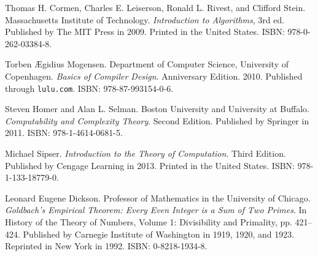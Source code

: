 \begin{thebibliography}{9}
\backrefprint


Thomas H. Cormen, Charles E. Leiserson, Ronald L. Rivest, and Clifford Stein.
Massachusetts Institute of Technology.  \emph{Introduction to Algorithms}, 3rd
ed. Published by The MIT Press in 2009. Printed in the United States. ISBN:
978-0-262-03384-8.

\backrefprint


Torben Ægidius Mogensen. Department of Computer Science, University of
Copenhagen. \emph{Basics of Compiler Design}. Anniversary Edition. 2010.
Published through \texttt{lulu.com}. ISBN: 978-87-993154-0-6.

\backrefprint





Steven Homer and Alan L. Selman. Boston University and University at Buffalo.
\emph{Computability and Complexity Theory}. Second Edition. Published by
Springer in 2011. ISBN: 978-1-4614-0681-5.

\backrefprint


Michael Sipser. \emph{Introduction to the Theory of Computation}. Third
Edition. Published by Cengage Learning in 2013. Printed in the United States.
ISBN: 978-1-133-18779-0.

\backrefprint




Leonard Eugene Dickson. Professor of Mathematics in the University of Chicago.
\emph{Goldbach's Empirical Theorem: Every Even Integer is a Sum of Two Primes}.
In History of the Theory of Numbers, Volume 1: Divisibility and Primality, pp.
421--424.  Published by Carnegie Institute of Washington in 1919, 1920, and
1923.  Reprinted in New York in 1992. ISBN: 0-8218-1934-8.


\end{thebibliography}

